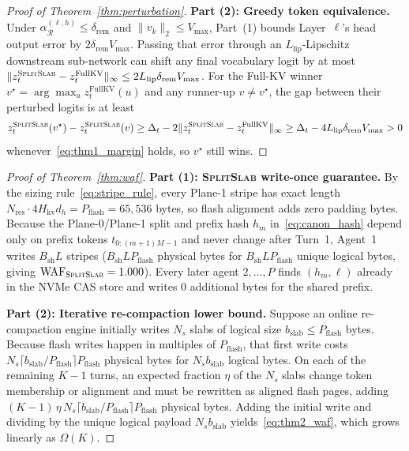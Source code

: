 \documentclass[pdflatex,sn-mathphys-num]{sn-jnl}
\theoremstyle{thmstyleone}
\newcommand{\SplitSlab}{\textsc{SplitSlab}}
\newcommand{\WAF}{\mathrm{WAF}}
\begin{document}
\begin{appendices}
\begin{proof}[Proof of Theorem~\ref{thm:perturbation}]
\textbf{Part (2): Greedy token equivalence.}
Under $\alpha_{\mathcal{R}}^{(\ell,h)} \le \delta_{\mathrm{rem}}$ and $\|v_k\|_2 \le V_{\max}$, Part~(1) bounds Layer~$\ell$'s head output error by $2 \delta_{\mathrm{rem}} V_{\max}$. Passing that error through an $L_{\mathrm{lip}}$-Lipschitz downstream sub-network can shift any final vocabulary logit by at most $\|z_t^{\SplitSlab} - z_t^{\mathrm{FullKV}}\|_\infty \le 2 L_{\mathrm{lip}} \delta_{\mathrm{rem}} V_{\max}$. For the Full-KV winner $v^\star = \arg\max_u z_t^{\mathrm{FullKV}}(u)$ and any runner-up $v \neq v^\star$, the gap between their perturbed logits is at least
\[
z_t^{\SplitSlab}(v^\star) - z_t^{\SplitSlab}(v)
\ge \Delta_t - 2 \|z_t^{\SplitSlab} - z_t^{\mathrm{FullKV}}\|_\infty
\ge \Delta_t - 4 L_{\mathrm{lip}} \delta_{\mathrm{rem}} V_{\max} > 0
\]
whenever~\eqref{eq:thm1_margin} holds, so $v^\star$ still wins.
\end{proof}

\begin{proof}[Proof of Theorem~\ref{thm:waf}]
\textbf{Part (1): \SplitSlab{} write-once guarantee.}
By the sizing rule~\eqref{eq:stripe_rule}, every Plane-1 stripe has exact length $N_{\mathrm{res}} \cdot 4 H_{\mathrm{kv}} d_h = P_{\mathrm{flash}} = 65{,}536$ bytes, so flash alignment adds zero padding bytes. Because the Plane-0/Plane-1 split and prefix hash $h_m$ in~\eqref{eq:canon_hash} depend only on prefix tokens $t_{0:(m+1)M-1}$ and never change after Turn~1, Agent~1 writes $B_{\mathrm{sh}} L$ stripes ($B_{\mathrm{sh}} L P_{\mathrm{flash}}$ physical bytes for $B_{\mathrm{sh}} L P_{\mathrm{flash}}$ unique logical bytes, giving $\WAF_{\SplitSlab} = 1.000$). Every later agent $2, \dots, P$ finds $(h_m, \ell)$ already in the NVMe CAS store and writes 0 additional bytes for the shared prefix.

\textbf{Part (2): Iterative re-compaction lower bound.}
Suppose an online re-compaction engine initially writes $N_s$ slabs of logical size $b_{\mathrm{slab}} \le P_{\mathrm{flash}}$ bytes. Because flash writes happen in multiples of $P_{\mathrm{flash}}$, that first write costs $N_s \lceil b_{\mathrm{slab}} / P_{\mathrm{flash}} \rceil P_{\mathrm{flash}}$ physical bytes for $N_s b_{\mathrm{slab}}$ logical bytes. On each of the remaining $K - 1$ turns, an expected fraction $\eta$ of the $N_s$ slabs change token membership or alignment and must be rewritten as aligned flash pages, adding $(K - 1)\,\eta\, N_s \lceil b_{\mathrm{slab}} / P_{\mathrm{flash}} \rceil P_{\mathrm{flash}}$ physical bytes. Adding the initial write and dividing by the unique logical payload $N_s b_{\mathrm{slab}}$ yields~\eqref{eq:thm2_waf}, which grows linearly as $\Omega(K)$.


\end{proof}
\end{appendices}
\end{document}
